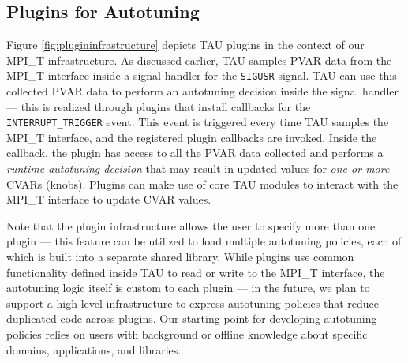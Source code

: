 \subsection{Plugins for Autotuning}
Figure \ref{fig:plugininfrastructure} depicts TAU plugins in the context of our MPI\_T infrastructure. As discussed earlier, TAU samples PVAR data from the MPI\_T interface inside a signal handler for the \verb+SIGUSR+ signal. TAU can use this collected PVAR data to perform an autotuning decision inside the signal handler --- this is realized through plugins that install callbacks for the \verb+INTERRUPT_TRIGGER+ event. This event is triggered every time TAU samples the MPI\_T interface, and the registered plugin callbacks are invoked. Inside the callback, the plugin has access to all the PVAR data collected and performs a \textit{runtime autotuning decision} that may result in updated values for \textit{one or more} CVARs (knobs). Plugins can make use of core TAU modules to interact with the MPI\_T interface to update CVAR values.
\par Note that the plugin infrastructure allows the user to specify more than one plugin --- this feature can be utilized to load multiple autotuning policies, each of which is built into a separate shared library. While plugins use common functionality defined inside TAU to read or write to the MPI\_T interface, the autotuning logic itself is custom to each plugin --- in the future, we plan to support a high-level infrastructure to express autotuning policies that reduce duplicated code across plugins. Our starting point for developing autotuning policies relies on users with background or offline knowledge about specific domains, applications, and libraries.

